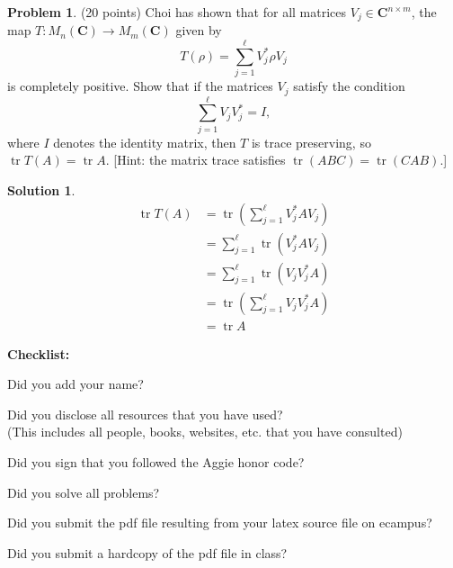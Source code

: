 \documentclass{article}
\theoremstyle{definition}
\newtheorem{problem}{Problem}
\newtheorem*{solution}{Solution}
\newcommand{\C}{\mathbf{C}}
\DeclareMathOperator{\tr}{tr}
\newcommand{\checklist}{\noindent\textbf{Checklist:}
\begin{compactitem}[$\Box$] 
\item Did you add your name? 
\item Did you disclose all resources that you have used? \\
(This includes all people, books, websites, etc. that you have consulted)
\item Did you sign that you followed the Aggie honor code? 
\item Did you solve all problems? 
\item Did you submit the pdf file resulting from your latex source
  file on ecampus? 
\item Did you submit a hardcopy of the pdf file in class? 
\end{compactitem}
}
\begin{document}
\begin{problem}{(20 points)}
Choi has shown that for all matrices $V_j\in \C^{n\times m}$, the map 
$T\colon M_n(\C) \rightarrow M_m(\C)$ given by 
$$ T(\rho)  = \sum_{j=1}^\ell V_j^* \rho V_j$$
is completely positive. Show that if the matrices $V_j$ satisfy the
condition
$$ \sum_{j=1}^\ell V_jV_j^* = I,$$
where $I$ denotes the identity matrix, then $T$ is trace preserving,
so $\tr T(A) = \tr A$. [Hint: the matrix trace satisfies $\tr(ABC)=\tr(CAB)$.]
\end{problem}
\begin{solution}
\begin{align*}
\tr T(A) & = \tr \left( \sum_{j=1}^\ell V_j^* A V_j \right)
\\ & =  \sum_{j=1}^\ell \tr (V_j^* A V_j)
\\ & =  \sum_{j=1}^\ell \tr (V_j V_j^* A )
\\ & =  \tr \left( \sum_{j=1}^\ell  V_j V_j^* A \right)
\\ & =  \tr  A 
\end{align*}

\end{solution}


\goodbreak
\checklist
\end{document}
